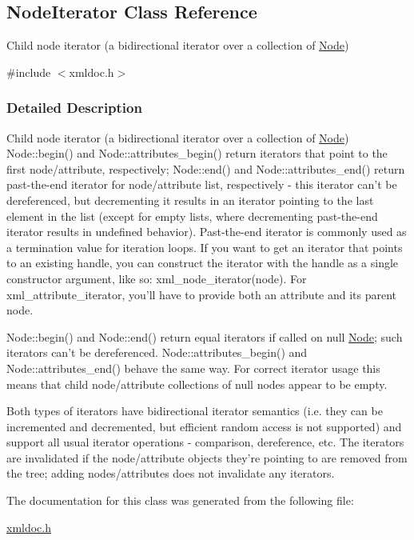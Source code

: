 \hypertarget{classNodeIterator}{
\subsection{NodeIterator Class Reference}
\label{classNodeIterator}
}


Child node iterator (a bidirectional iterator over a collection of \hyperlink{classNode}{Node})  




{\ttfamily \#include $<$xmldoc.h$>$}



\subsubsection{Detailed Description}
Child node iterator (a bidirectional iterator over a collection of \hyperlink{classNode}{Node}) Node::begin() and Node::attributes\_\-begin() return iterators that point to the first node/attribute, respectively; Node::end() and Node::attributes\_\-end() return past-\/the-\/end iterator for node/attribute list, respectively -\/ this iterator can't be dereferenced, but decrementing it results in an iterator pointing to the last element in the list (except for empty lists, where decrementing past-\/the-\/end iterator results in undefined behavior). Past-\/the-\/end iterator is commonly used as a termination value for iteration loops. If you want to get an iterator that points to an existing handle, you can construct the iterator with the handle as a single constructor argument, like so: xml\_\-node\_\-iterator(node). For xml\_\-attribute\_\-iterator, you'll have to provide both an attribute and its parent node.\par
\par
 Node::begin() and Node::end() return equal iterators if called on null \hyperlink{classNode}{Node}; such iterators can't be dereferenced. Node::attributes\_\-begin() and Node::attributes\_\-end() behave the same way. For correct iterator usage this means that child node/attribute collections of null nodes appear to be empty.\par
\par
 Both types of iterators have bidirectional iterator semantics (i.e. they can be incremented and decremented, but efficient random access is not supported) and support all usual iterator operations -\/ comparison, dereference, etc. The iterators are invalidated if the node/attribute objects they're pointing to are removed from the tree; adding nodes/attributes does not invalidate any iterators. 

The documentation for this class was generated from the following file:\begin{DoxyCompactItemize}
\item 
\hyperlink{xmldoc_8h}{xmldoc.h}\end{DoxyCompactItemize}
